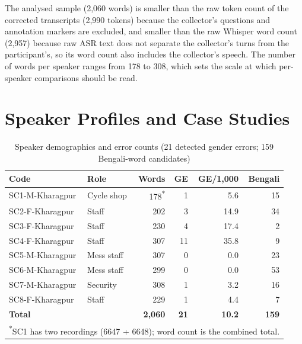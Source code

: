 \documentclass[11pt,a4paper]{report}
\begin{document}
The analysed sample (2,060 words) is smaller than the raw token count of the corrected transcripts (2,990 tokens) because the collector's questions and annotation markers are excluded, and smaller than the raw Whisper word count (2,957) because raw ASR text does not separate the collector's turns from the participant's, so its word count also includes the collector's speech. The number of words per speaker ranges from 178 to 308, which sets the scale at which per-speaker comparisons should be read.

\chapter{Speaker Profiles and Case Studies}
\label{sec:speakers}

\begin{table}[H]
\centering
\caption{Speaker demographics and error counts (21 detected gender errors; 159 Bengali-word candidates)}
\label{tab:speakers}
\small
\begin{tabular}{llrrrr}
\toprule
\textbf{Code} & \textbf{Role} & \textbf{Words} & \textbf{GE} & \textbf{GE/1,000} & \textbf{Bengali} \\
\midrule
SC1-M-Kharagpur & Cycle shop & 178\textsuperscript{*} & 1 &  5.6 & 15 \\
SC2-F-Kharagpur & Staff & 202 & 3 & 14.9 & 34 \\
SC3-F-Kharagpur & Staff & 230 & 4 & 17.4 &  2 \\
SC4-F-Kharagpur & Staff & 307 & 11 & 35.8 &  9 \\
SC5-M-Kharagpur & Mess staff & 307 & 0 &  0.0 & 23 \\
SC6-M-Kharagpur & Mess staff & 299 & 0 &  0.0 & 53 \\
SC7-M-Kharagpur & Security & 308 & 1 &  3.2 & 16 \\
SC8-F-Kharagpur & Staff & 229 & 1 &  4.4 &  7 \\
\midrule
\multicolumn{2}{l}{\textbf{Total}} & \textbf{2,060} & \textbf{21} & \textbf{10.2} & \textbf{159} \\
\multicolumn{6}{l}{\footnotesize \textsuperscript{*}SC1 has two recordings (6647 + 6648); word count is the combined total.} \\
\bottomrule
\end{tabular}
\end{table}
\end{document}
